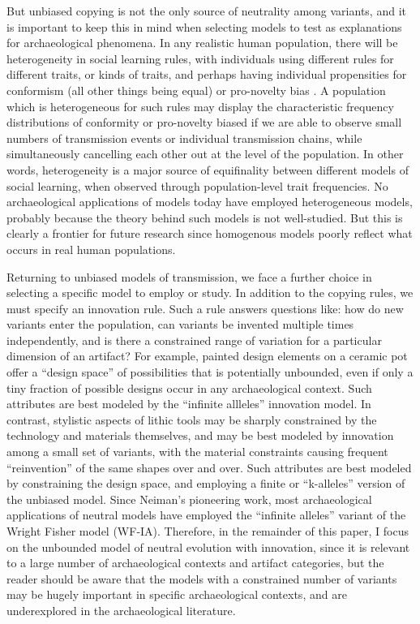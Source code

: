 But unbiased copying is not the only source of neutrality among variants, and it is important to keep this in mind when selecting models to test as explanations for archaeological phenomena.   In any realistic human population, there will be heterogeneity in social learning rules, with individuals using different rules for different traits, or kinds of traits, and perhaps having individual propensities for conformism (all other things being equal) or pro-novelty bias \citep{Mesoudi2009}.  A population which is heterogeneous for such rules may display the characteristic frequency distributions of conformity or pro-novelty biased if we are able to observe small numbers of transmission events or individual transmission chains, while simultaneously cancelling each other out at the level of the population.  In other words, heterogeneity is a major source of equifinality between different models of social learning, when observed through population-level trait frequencies.   No archaeological applications of \ct models today have employed heterogeneous models, probably because the theory behind such models is not well-studied.  But this is clearly a frontier for future research since homogenous models poorly reflect what occurs in real human populations.  

Returning to unbiased models of transmission, we face a further choice in selecting a specific model to employ or study.  In addition to the copying rules, we must specify an innovation rule.  Such a rule answers questions like:  how do new variants enter the population, can variants be invented multiple times independently, and is there a constrained range of variation for a particular dimension of an artifact?  For example, painted design elements on a ceramic pot offer a ``design space'' of possibilities that is potentially unbounded, even if only a tiny fraction of possible designs occur in any archaeological context.  Such attributes are best modeled by the ``infinite allleles'' innovation model.  In contrast, stylistic aspects of lithic tools may be sharply constrained by the technology and materials themselves, and may be best modeled by innovation among a small set of variants, with the material constraints causing frequent ``reinvention'' of the same shapes over and over.   Such attributes are best modeled by constraining the design space, and employing a finite or ``k-alleles'' version of the unbiased model.   Since Neiman's pioneering work, most archaeological applications of neutral models have employed the ``infinite alleles'' variant of the Wright Fisher model  (WF-IA)\citep{kimura1964number}.  Therefore, in the remainder of this paper, I focus on the unbounded model of neutral evolution with innovation, since it is relevant to a large number of archaeological contexts and artifact categories, but the reader should be aware that the models with a constrained number of variants may be hugely important in specific archaeological contexts, and are underexplored in the archaeological literature.  

